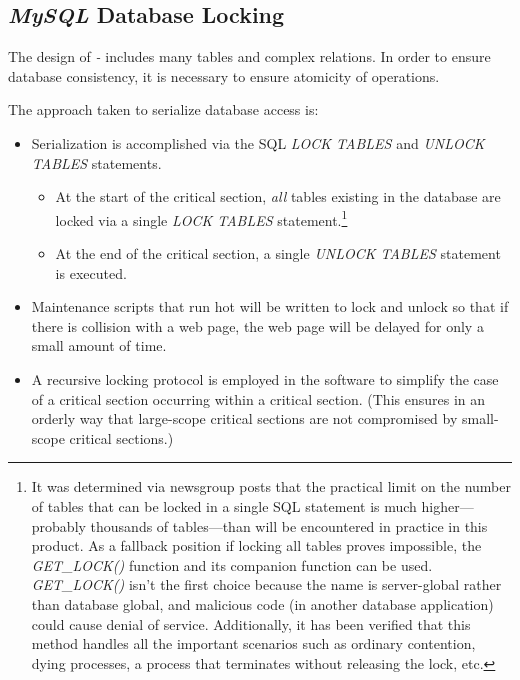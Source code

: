 \subsection{\emph{MySQL} Database Locking}
\label{ctbg0:sddd0:smdl0}

The design of \emph{\productbasename{}-\productversion{}} includes
many tables and complex relations.  In order to ensure database
consistency, it is necessary to ensure atomicity of operations.

The approach taken to serialize database access is:

\begin{itemize}
\item Serialization is accomplished via the SQL \emph{LOCK TABLES}
      and \emph{UNLOCK TABLES} statements.

      \begin{itemize}
      \item At the start of the critical section, \emph{all} tables existing
            in the database are locked via a single \emph{LOCK TABLES}
            statement.\footnote{It was determined via newsgroup posts
            that the practical limit on the number of tables that can 
            be locked in a single SQL statement is much higher---probably
            thousands of tables---than will be encountered in practice in
            this product.  As a fallback position if locking all tables
            proves impossible, the \emph{GET\_LOCK()} 
            function and its companion function can be used.  \emph{GET\_LOCK()}
            isn't the first choice because the name is server-global rather
            than database global, and malicious code (in another database
            application) could cause denial of service.  Additionally, it has
            been verified that this method handles all the important scenarios
            such as ordinary contention, dying processes, a process that 
            terminates without releasing the lock, etc.}
      \item At the end of the critical section, a single \emph{UNLOCK TABLES}
            statement is executed.
      \end{itemize}
\item Maintenance scripts that run hot will be written to lock and unlock so that
      if there is collision with a web page, the web page will be delayed for only
      a small amount of time.
\item A recursive locking protocol is employed in the software to simplify the case
      of a critical section occurring within a critical section.  (This ensures
      in an orderly way
      that large-scope critical sections are not compromised by small-scope critical
      sections.)
\end{itemize}



